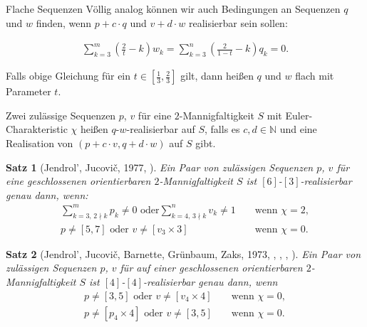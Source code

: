 \documentclass[10pt, notheorems]{beamer}
\newtheorem{theorem}{Satz}[section]
\newcommand{\nats}{\mathbb{N}}
\newcommand{\hdef}[1]{\textcolor{darkred2}{#1}}
\begin{document}
\begin{frame}{Flache Sequenzen}
  Völlig analog können wir auch Bedingungen an Sequenzen $q$ und $w$ finden, wenn $p+c\cdot q$ und $v+d\cdot w$ realisierbar sein sollen:
  \begin{block}{}
    \begin{align*}
      \sum_{k=3}^m \left(\frac{2}{t} - k \right) w_k = \sum_{k=3}^n \left( \frac{2}{1-t} - k \right) q_k = 0.
    \end{align*}
  \end{block}
  \pause
  Falls obige Gleichung für ein $t \in \left[\tfrac{1}{3}, \tfrac{2}{3}\right]$ gilt, dann heißen $q$ und $w$ \hdef{flach mit Parameter $t$}.
  \pause
  \begin{definition}
    Zwei zulässige Sequenzen $p$, $v$ für eine $2$-Mannigfaltigkeit $S$ mit {\sc Euler}-Charakteristic $\chi$ heißen \hdef{$q$-$w$-realisierbar auf $S$}, falls es $c, d \in \nats$ und eine Realisation von $(p + c \cdot v, q + d \cdot w)$ auf $S$ gibt.
  \end{definition}
\end{frame}

\begin{frame}
  \begin{theorem}[{\sc Jendrol', Jucovi{\v{c}}}, 1977, \cite{jendrol1977generalization}] \label{thm:eberhard:extended:3}
    Ein Paar von zulässigen Sequenzen $p$, $v$ für eine geschlossenen orientierbaren $2$-Mannigfaltigkeit $S$ ist $[6]$-$[3]$-realisierbar genau dann, wenn:
    \begin{align*}
      \sum_{k=3,\,2 \nmid k}^{m} p_k \neq 0 \text{ oder} \sum_{k=4,\,3 \nmid k}^n v_k \neq 1& &\text{ wenn } \chi = 2, \\
      p \neq [5, 7] \text{ oder } v \neq [v_3 \times 3]& &\text{ wenn } \chi = 0.
    \end{align*}
  \end{theorem}
  \pause
  \begin{theorem}[{\sc Jendrol', Jucovi{\v{c}}, Barnette, Grünbaum, Zaks}, 1973, \cite{jucovivc1973theorem}, \cite{barnette1971toroidal}, \cite{grunbaum1969planar}, \cite{zaks1971analogue}] \label{thm:eberhard:extended:4}
    Ein Paar von zulässigen Sequenzen $p$, $v$ für auf einer geschlossenen orientierbaren $2$-Mannigfaltigkeit $S$ ist $[4]$-$[4]$-realisierbar genau dann, wenn
    \begin{align*}
      p \neq [3, 5] \text{ oder } v \neq [v_4 \times 4]& &\text{ wenn } \chi = 0,\\
      p \neq [p_4 \times 4] \text{ oder } v \neq [3, 5]& &\text{ wenn } \chi = 0.
    \end{align*}
  \end{theorem}
\end{frame}
\end{document}
